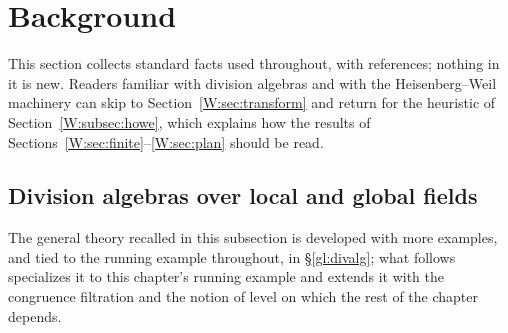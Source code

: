 \section{Background}\label{W:sec:background}
This section collects standard facts used throughout, with references;
nothing in it is new.  Readers familiar with division algebras and with
the Heisenberg--Weil machinery can skip to Section~\ref{W:sec:transform}
and return for the heuristic of Section~\ref{W:subsec:howe}, which explains
how the results of Sections~\ref{W:sec:finite}--\ref{W:sec:plan} should be
read.

\subsection{Division algebras over local and global fields}\label{W:subsec:divalg}
The general theory recalled in this subsection is developed with
more examples, and tied to the running example throughout, in
\S\ref{gl:divalg}; what follows specializes it to this chapter's
running example and extends it with the congruence filtration and
the notion of level on which the rest of the chapter depends.

